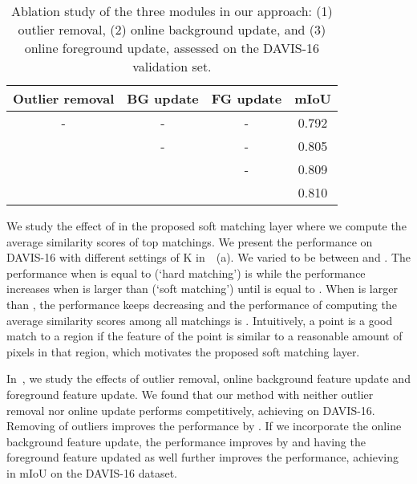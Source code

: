 \begin{table}[t]
\centering
\caption{Ablation study of the three modules in our approach: (1)  outlier removal, (2) online background update, and (3) online foreground update, assessed on the DAVIS-16 validation set.}
\label{tab:ablation}
		\tabcolsep=7pt
\begin{tabular}{cccc}
	\toprule
Outlier removal & BG update & FG update & mIoU  \\
\midrule
-               		& -         & -         & 0.792 \\
   & -         & -         & 0.805 \\
   &  & -         & 0.809 \\
   &  &  & 0.810 \\
\bottomrule
\end{tabular}
\end{table} 
 We study the effect of  in the proposed soft matching layer where we compute the average similarity scores of top  matchings. We present the performance on DAVIS-16 with different settings of K in~~(a). We varied  to be between  and . The performance when  is equal to  (`hard matching') is  while the performance increases when  is larger than  (`soft matching') until  is equal to . When  is larger than , the performance keeps decreasing and the performance of computing the average similarity scores among all matchings is . Intuitively, a point is a good match to a region if the feature of the point is similar to a reasonable amount of pixels in that region, which motivates the proposed  soft matching layer.

In~, we study the effects of outlier removal, online background feature update and foreground feature update. We found that our method with neither outlier removal nor online update performs competitively, achieving  on DAVIS-16. Removing of outliers improves the performance by . If we incorporate  the online background feature update, the performance improves by  and having the foreground feature updated as well further improves the performance, achieving  in mIoU on the DAVIS-16 dataset.



